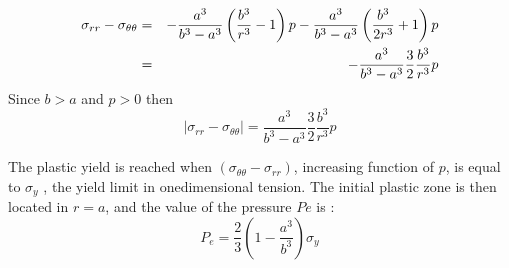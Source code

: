 \begin{eqnarray}
\sigma_{rr}-\sigma_{\theta\theta}
&=& 
-\frac{a^3}{b^3-a^3} \left( \frac{b^3}{r^3}-1 \right) p 
-\frac{a^3}{b^3-a^3} \left( \frac{b^3}{2r^3}+1 \right) p \nonumber\\
&=& 
-\frac{a^3}{b^3-a^3}\frac32 \frac{b^3}{r^3}  p 
\end{eqnarray}
Since $b>a$ and $p>0$ then 
\[
| \sigma_{rr}-\sigma_{\theta\theta} |=
\frac{a^3}{b^3-a^3}\frac32 \frac{b^3}{r^3}  p 
\]

The plastic yield is reached when $(\sigma_{\theta\theta} - \sigma_{rr})$, 
increasing function of $p$, is equal to $\sigma_y$ , the yield limit
in onedimensional tension. The initial plastic zone is then located in $r=a$, 
and the value of the pressure $Pe$ is :
\[
P_e = \frac23 \left( 1 - \frac{a^3}{b^3} \right)\sigma_y
\]










